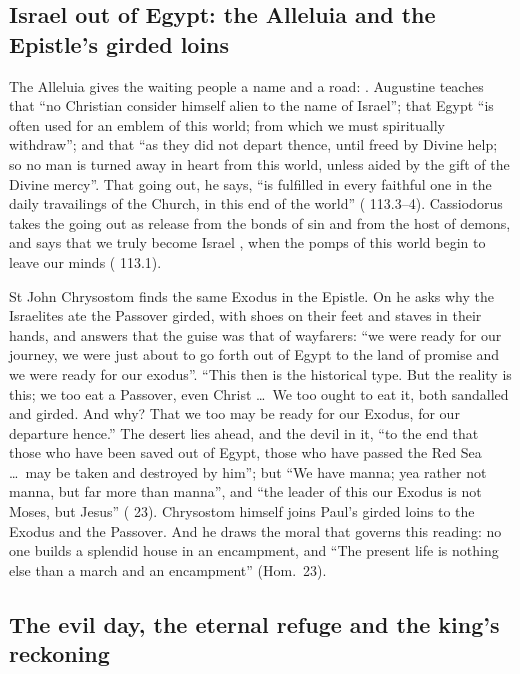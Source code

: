 \subsection{Israel out of Egypt: the Alleluia and the Epistle's girded loins}

The Alleluia gives the waiting people a name and a road: . Augustine teaches that ``no Christian consider himself alien to the
name of Israel''; that Egypt ``is often used for an emblem of this world; from
which we must spiritually withdraw''; and that ``as they did not depart thence,
until freed by Divine help; so no man is turned away in heart from this world,
unless aided by the gift of the Divine mercy''. That going out, he says, ``is
fulfilled in every faithful one in the daily travailings of the Church, in this
end of the world'' ( 113.3--4). Cassiodorus takes the going out
as release from the bonds of sin and from the host of demons, and says that we
truly become Israel , when the pomps of this world begin to leave our minds
( 113.1).

St John Chrysostom finds the same Exodus in the Epistle. On  he asks why the Israelites ate the Passover
girded, with shoes on their feet and staves in their hands, and answers that the
guise was that of wayfarers: ``we were ready for our journey, we were just about
to go forth out of Egypt to the land of promise and we were ready for our
exodus''. ``This then is the historical type. But the reality is this; we too eat
a Passover, even Christ \dots\ We too ought to eat it, both sandalled and girded.
And why? That we too may be ready for our Exodus, for our departure hence.'' The
desert lies ahead, and the devil in it, ``to the end that those who have been
saved out of Egypt, those who have passed the Red Sea \dots\ may be taken and
destroyed by him''; but ``We have manna; yea rather not manna, but far more than
manna'', and ``the leader of this our Exodus is not Moses, but Jesus''
( 23). Chrysostom himself joins Paul's girded loins to
the Exodus and the Passover. And he draws the moral that governs this reading:
no one builds a splendid house in an encampment, and ``The present life is nothing
else than a march and an encampment'' (Hom.\ 23).

\subsection{The evil day, the eternal refuge and the king's reckoning}

